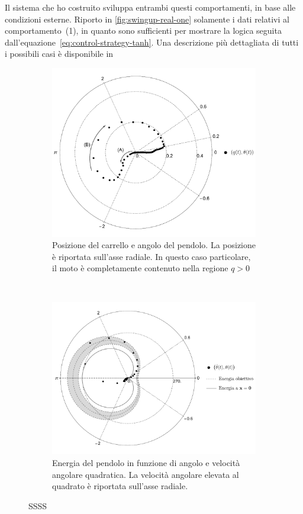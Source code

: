 Il sistema che ho costruito sviluppa entrambi questi comportamenti,
in base alle condizioni esterne\footnotemark .
Riporto in \autoref{fig:swingup-real-one} solamente i dati relativi al comportamento~(1), in quanto sono
sufficienti per mostrare la logica seguita dall'equazione~\eqref{eq:control-strategy-tanh}.
Una descrizione più dettagliata di tutti i possibili casi è disponibile in


\begin{figure}
    \centering
    \begin{subfigure}[]{\textwidth}
        \centering
        \includegraphics[width=.75\textwidth]{assets/polar-swingup-real}
        \caption{Posizione del carrello e angolo del pendolo.
        La posizione è riportata sull'asse radiale. In questo
        caso particolare, il moto è
        completamente contenuto nella regione $q > 0$
        }
    \end{subfigure}
    \\[5ex]
    \begin{subfigure}[]{\textwidth}
        \centering
        \includegraphics[width=.8\textwidth]{assets/polar-swingup-energy}
        \caption{Energia del pendolo in funzione di angolo e
        velocità angolare quadratica.
        La velocità angolare elevata al quadrato è riportata sull'asse
        radiale.
        }
    \end{subfigure}

    \caption[Dati di una procedura di swing-up]{
        SSSS
    }
    \label{fig:swingup-real-one}
\end{figure}



